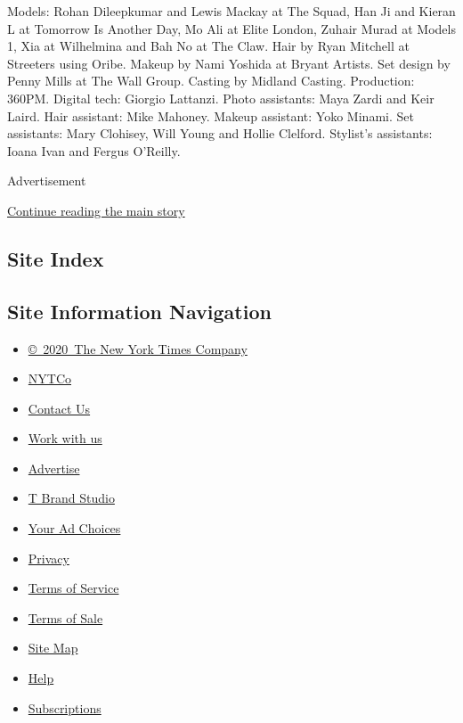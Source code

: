 Models: Rohan Dileepkumar and Lewis Mackay at The Squad, Han Ji and
Kieran L at Tomorrow Is Another Day, Mo Ali at Elite London, Zuhair
Murad at Models 1, Xia at Wilhelmina and Bah No at The Claw. Hair by
Ryan Mitchell at Streeters using Oribe. Makeup by Nami Yoshida at Bryant
Artists. Set design by Penny Mills at The Wall Group. Casting by Midland
Casting. Production: 360PM. Digital tech: Giorgio Lattanzi. Photo
assistants: Maya Zardi and Keir Laird. Hair assistant: Mike Mahoney.
Makeup assistant: Yoko Minami. Set assistants: Mary Clohisey, Will Young
and Hollie Clelford. Stylist's assistants: Ioana Ivan and Fergus
O'Reilly.

Advertisement

\protect\hyperlink{after-bottom}{Continue reading the main story}

\hypertarget{site-index}{%
\subsection{Site Index}\label{site-index}}

\hypertarget{site-information-navigation}{%
\subsection{Site Information
Navigation}\label{site-information-navigation}}

\begin{itemize}
\tightlist
\item
  \href{https://help.nytimes3xbfgragh.onion/hc/en-us/articles/115014792127-Copyright-notice}{©~2020~The
  New York Times Company}
\end{itemize}

\begin{itemize}
\tightlist
\item
  \href{https://www.nytco.com/}{NYTCo}
\item
  \href{https://help.nytimes3xbfgragh.onion/hc/en-us/articles/115015385887-Contact-Us}{Contact
  Us}
\item
  \href{https://www.nytco.com/careers/}{Work with us}
\item
  \href{https://nytmediakit.com/}{Advertise}
\item
  \href{http://www.tbrandstudio.com/}{T Brand Studio}
\item
  \href{https://www.nytimes3xbfgragh.onion/privacy/cookie-policy\#how-do-i-manage-trackers}{Your
  Ad Choices}
\item
  \href{https://www.nytimes3xbfgragh.onion/privacy}{Privacy}
\item
  \href{https://help.nytimes3xbfgragh.onion/hc/en-us/articles/115014893428-Terms-of-service}{Terms
  of Service}
\item
  \href{https://help.nytimes3xbfgragh.onion/hc/en-us/articles/115014893968-Terms-of-sale}{Terms
  of Sale}
\item
  \href{https://spiderbites.nytimes3xbfgragh.onion}{Site Map}
\item
  \href{https://help.nytimes3xbfgragh.onion/hc/en-us}{Help}
\item
  \href{https://www.nytimes3xbfgragh.onion/subscription?campaignId=37WXW}{Subscriptions}
\end{itemize}
